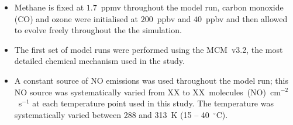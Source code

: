 \begin{itemize}
    \item Methane is fixed at $1.7$~ppmv throughout the model run, carbon monoxide (CO) and ozone were initialised at $200$~ppbv and $40$~ppbv and then allowed to evolve freely throughout the the simulation.
    \item The first set of model runs were performed using the MCM~v3.2, the most detailed chemical mechanism used in the study.
    \item A constant source of NO emissions was used throughout the model run; this NO source was systematically varied from XX to XX~molecules~(NO)~cm$^{-2}$~s$^{-1}$ at each temperature point used in this study. The temperature was systematically varied between 288 and 313~K (15 -- 40~$^{\circ}$C).
\end{itemize}
%        

